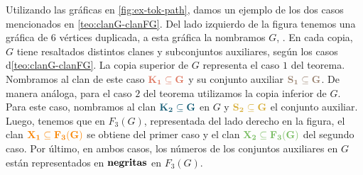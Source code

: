 Utilizando las gr\'aficas en \cref{fig:ex-tok-path}, damos un ejemplo de los dos
casos mencionados en \cref{teo:clanG-clanFG}. Del lado izquierdo de la figura
tenemos una gr\'afica de $6$ v\'ertices duplicada, a esta gr\'afica la nombramos
$G$, . En cada copia, $G$ tiene resaltados distintos clanes y subconjuntos
auxiliares, seg\'un los casos d\cref{teo:clanG-clanFG}. La copia superior de $G$
representa el caso $1$ del teorema. Nombramos al clan de este caso
${\color{salmon}\bf K_1 \subseteq G}$ y su conjunto auxiliar ${\color{baige}\bf
S_1\subseteq G}$. De manera an\'aloga, para el caso $2$ del teorema utilizamos
la copia inferior de $G$. Para este caso, nombramos al clan
${\color{azulOscuro}\bf K_2\subseteq G}$ en $G$ y ${\color{oro}\bf S_2\subseteq
G}$ el conjunto auxiliar. Luego, tenemos que en $F_3(G)$, representada del
lado derecho en la figura, el clan ${\color{naranja}\bf X_1\subseteq F_3(G)}$ se
obtiene del primer caso y el clan ${\color{verde}\bf X_2 \subseteq F_3(G)}$ del
segundo caso. Por \'ultimo, en ambos casos, los n\'umeros de los conjuntos
auxiliares en $G$ est\'an representados en ${\bf negritas}$ en $F_3(G)$.

